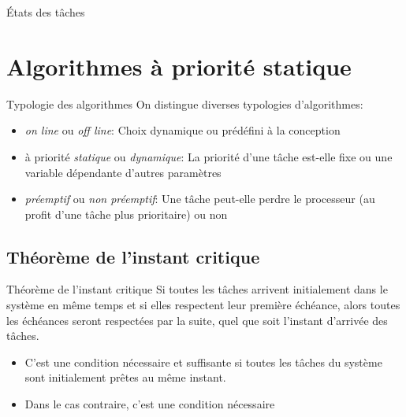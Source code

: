\begin{frame}{États des tâches}
  \begin{center}
    
  \end{center}
\end{frame}


\section{Algorithmes à priorité statique}

\begin{frame}{Typologie des algorithmes}
  On distingue diverses typologies d'algorithmes:
  \begin{itemize}
  \item  \emph{on  line}  ou   \emph{off  line}:  Choix  dynamique  ou
    prédéfini à la conception
  \item  à priorité \emph{statique}  ou \emph{dynamique}:  La priorité
    d'une  tâche est-elle  fixe  ou une  variable dépendante  d'autres
    paramètres
  \item \emph{préemptif} ou  \emph{non préemptif}: Une tâche peut-elle
    perdre le  processeur (au profit d'une tâche  plus prioritaire) ou
    non
  \end{itemize}
\end{frame}

\subsection{Théorème de l'instant critique}

\begin{frame}{Théorème de l'instant critique}
  Si toutes les  tâches arrivent initialement dans le  système en même
  temps et  si elles respectent  leur première échéance,  alors toutes
  les  échéances  seront  respectées  par  la  suite,  quel  que  soit
  l'instant d'arrivée des tâches.

  \begin{itemize}
  \item  C'est une condition  nécessaire et  suffisante si  toutes les
    tâches du système sont initialement prêtes au même instant.
  \item Dans le cas contraire, c'est une condition nécessaire
  \end{itemize}

\end{frame}


